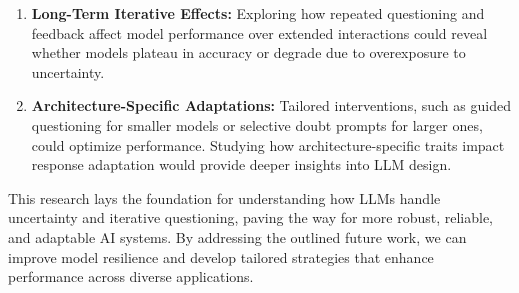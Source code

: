\begin{enumerate}
  \item \textbf{Long-Term Iterative Effects:} Exploring how repeated questioning and feedback affect model performance over extended interactions could reveal whether models plateau in accuracy or degrade due to overexposure to uncertainty.

  \item \textbf{Architecture-Specific Adaptations:} Tailored interventions, such as guided questioning for smaller models or selective doubt prompts for larger ones, could optimize performance. Studying how architecture-specific traits impact response adaptation would provide deeper insights into LLM design.
\end{enumerate}

This research lays the foundation for understanding how LLMs handle uncertainty and iterative questioning, paving the way for more robust, reliable, and adaptable AI systems. By addressing the outlined future work, we can improve model resilience and develop tailored strategies that enhance performance across diverse applications.
